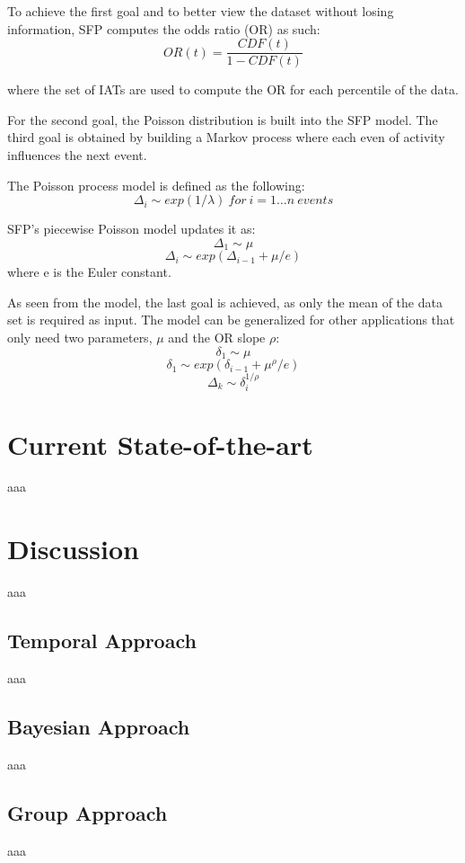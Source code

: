 \documentclass[11pt, oneside]{article}   	%
\begin{document}
To achieve the first goal and to better view the dataset without losing information, SFP computes the odds ratio (OR) as such:
$$ OR(t) = \frac{CDF(t)}{1-CDF(t)} $$

where the set of IATs are used to compute the OR for each percentile of the data.

For the second goal, the Poisson distribution is built into the SFP model.
The third goal is obtained by building a Markov process where each even of activity influences the next event.

The Poisson process model is defined as the following:
$$ \Delta_i \sim exp(1/ \lambda) \ for \ i = 1 \dots n \ events $$

SFP's piecewise Poisson model updates it as:
$$ \Delta_1 \sim \mu $$
$$ \Delta_i \sim exp(\Delta_{i-1} + \mu / e) $$
where e is the Euler constant.

As seen from the model, the last goal is achieved, as only the mean of the data set is required as input.
The model can be generalized for other applications that only need two parameters, $\mu$ and the OR slope $\rho$:
$$ \delta_1 \sim \mu $$
$$ \delta_1 \sim exp(\delta_{i-1} + \mu^{\rho} / e) $$
$$ \Delta_k \sim \delta_i^{1/ \rho} $$

\section*{Current State-of-the-art}

aaa

\section*{Discussion}

aaa

\subsection*{Temporal Approach}

aaa

\subsection*{Bayesian Approach}

aaa

\subsection*{Group Approach}

aaa
\end{document}

